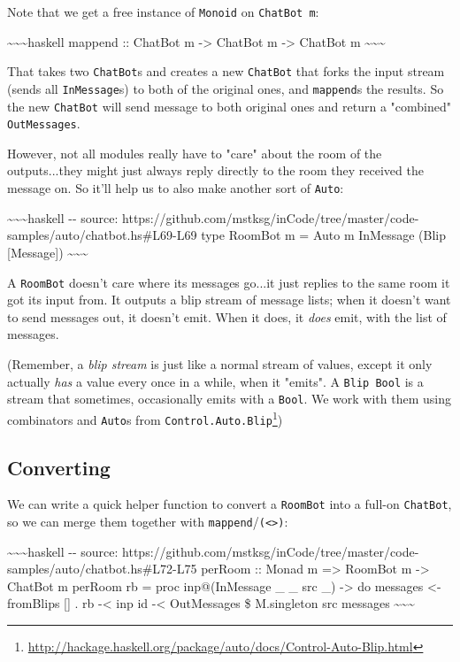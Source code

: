 \documentclass[]{article}
\renewcommand{\href}[2]{#2\footnote{\url{#1}}}
\begin{document}
Note that we get a free instance of \texttt{Monoid} on \texttt{ChatBot\ m}:

\textasciitilde{}\textasciitilde{}\textasciitilde{}haskell mappend :: ChatBot m
-\textgreater{} ChatBot m -\textgreater{} ChatBot m
\textasciitilde{}\textasciitilde{}\textasciitilde{}

That takes two \texttt{ChatBot}s and creates a new \texttt{ChatBot} that forks
the input stream (sends all \texttt{InMessage}s) to both of the original ones,
and \texttt{mappend}s the results. So the new \texttt{ChatBot} will send message
to both original ones and return a "combined" \texttt{OutMessages}.

However, not all modules really have to "care" about the room of the
outputs...they might just always reply directly to the room they received the
message on. So it'll help us to also make another sort of \texttt{Auto}:

\textasciitilde{}\textasciitilde{}\textasciitilde{}haskell -\/- source:
https://github.com/mstksg/inCode/tree/master/code-samples/auto/chatbot.hs\#L69-L69
type RoomBot m = Auto m InMessage (Blip {[}Message{]})
\textasciitilde{}\textasciitilde{}\textasciitilde{}

A \texttt{RoomBot} doesn't care where its messages go...it just replies to the
same room it got its input from. It outputs a blip stream of message lists; when
it doesn't want to send messages out, it doesn't emit. When it does, it
\emph{does} emit, with the list of messages.

(Remember, a \emph{blip stream} is just like a normal stream of values, except
it only actually \emph{has} a value every once in a while, when it "emits". A
\texttt{Blip\ Bool} is a stream that sometimes, occasionally emits with a
\texttt{Bool}. We work with them using combinators and \texttt{Auto}s from
\href{http://hackage.haskell.org/package/auto/docs/Control-Auto-Blip.html}{\texttt{Control.Auto.Blip}})

\subsection{Converting}

We can write a quick helper function to convert a \texttt{RoomBot} into a
full-on \texttt{ChatBot}, so we can merge them together with
\texttt{mappend}/\texttt{(\textless{}\textgreater{})}:

\textasciitilde{}\textasciitilde{}\textasciitilde{}haskell -\/- source:
https://github.com/mstksg/inCode/tree/master/code-samples/auto/chatbot.hs\#L72-L75
perRoom :: Monad m =\textgreater{} RoomBot m -\textgreater{} ChatBot m perRoom
rb = proc inp@(InMessage \_ \_ src \_) -\textgreater{} do messages \textless{}-
fromBlips {[}{]} . rb -\textless{} inp id -\textless{} OutMessages \$
M.singleton src messages \textasciitilde{}\textasciitilde{}\textasciitilde{}
\end{document}
